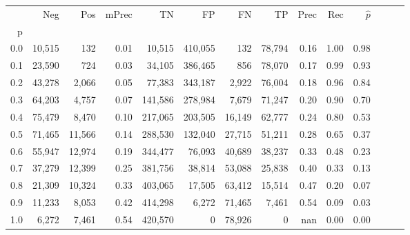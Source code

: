 \begin{tabular}{rrrrrrrrrrrrrr}
\toprule
{} &     Neg &     Pos & mPrec &       TN &       FP &      FN &      TP &  Prec &   Rec & $\hat{p}$ \\
p   &         &         &       &          &          &         &         &       &       &           \\
\midrule
0.0 &  10,515 &     132 &  0.01 &   10,515 &  410,055 &     132 &  78,794 &  0.16 &  1.00 &      0.98 \\
0.1 &  23,590 &     724 &  0.03 &   34,105 &  386,465 &     856 &  78,070 &  0.17 &  0.99 &      0.93 \\
0.2 &  43,278 &   2,066 &  0.05 &   77,383 &  343,187 &   2,922 &  76,004 &  0.18 &  0.96 &      0.84 \\
0.3 &  64,203 &   4,757 &  0.07 &  141,586 &  278,984 &   7,679 &  71,247 &  0.20 &  0.90 &      0.70 \\
0.4 &  75,479 &   8,470 &  0.10 &  217,065 &  203,505 &  16,149 &  62,777 &  0.24 &  0.80 &      0.53 \\
0.5 &  71,465 &  11,566 &  0.14 &  288,530 &  132,040 &  27,715 &  51,211 &  0.28 &  0.65 &      0.37 \\
0.6 &  55,947 &  12,974 &  0.19 &  344,477 &   76,093 &  40,689 &  38,237 &  0.33 &  0.48 &      0.23 \\
0.7 &  37,279 &  12,399 &  0.25 &  381,756 &   38,814 &  53,088 &  25,838 &  0.40 &  0.33 &      0.13 \\
0.8 &  21,309 &  10,324 &  0.33 &  403,065 &   17,505 &  63,412 &  15,514 &  0.47 &  0.20 &      0.07 \\
0.9 &  11,233 &   8,053 &  0.42 &  414,298 &    6,272 &  71,465 &   7,461 &  0.54 &  0.09 &      0.03 \\
1.0 &   6,272 &   7,461 &  0.54 &  420,570 &        0 &  78,926 &       0 &   nan &  0.00 &      0.00 \\
\bottomrule
\end{tabular}
